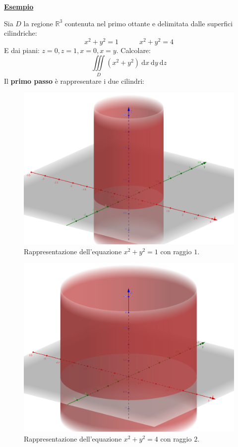 \documentclass[a4paper]{article}
\newcommand{\example}[1]{\textcolor{Green4}{\textbf{#1}}}
\begin{document}
	\begin{flushleft}
		\example{\underline{Esempio}}
	\end{flushleft}
	Sia $D$ la regione $\mathbb{R}^{3}$ contenuta nel primo ottante e delimitata dalle superfici cilindriche:
	\begin{equation*}
		x^{2}+y^{2} = 1 \hspace{3em} x^{2}+y^{2} = 4
	\end{equation*}
	E dai piani: $z=0,z=1,x=0,x=y$. Calcolare:
	\begin{equation*}
		\displaystyle\iiint\limits_{D}\left(x^{2}+y^{2}\right) \:\mathrm{d}x\:\mathrm{d}y\:\mathrm{d}z
	\end{equation*}
	Il \textbf{primo passo} è rappresentare i due cilindri:
	\begin{figure}[!htp]
		\centering
		\includegraphics[width=.7\textwidth]{img/integrali_tripli-coordinate_cilindriche_1.png}
		\caption{Rappresentazione dell'equazione $x^{2}+y^{2} = 1$ con raggio $1$.}
	\end{figure}
	\begin{figure}[!htp]
		\centering
		\includegraphics[width=.7\textwidth]{img/integrali_tripli-coordinate_cilindriche_2.png}
		\caption{Rappresentazione dell'equazione $x^{2}+y^{2} = 4$ con raggio $2$.}
	\end{figure}\newpage
\end{document}
